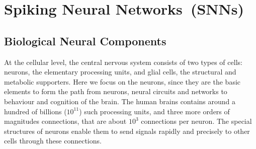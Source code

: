 \chapter{Spiking Neural Networks~(SNNs)}
\label{cha:bkg}

\section{Biological Neural Components}
At the cellular level, the central nervous system consists of two types of cells: neurons, the elementary processing units, and glial cells, the structural and metabolic supporters. 
Here we focus on the neurons, since they are the basic elements to form the path from neurons, neural circuits and networks to behaviour and cognition of the brain.
The human brains contains around a hundred of billions ($10^{11}$) such processing units, and three more orders of magnitudes connections, that are about $10^3$ connections per neuron.
The special structures of neurons enable them to send signals rapidly and precisely to other cells through these connections.
